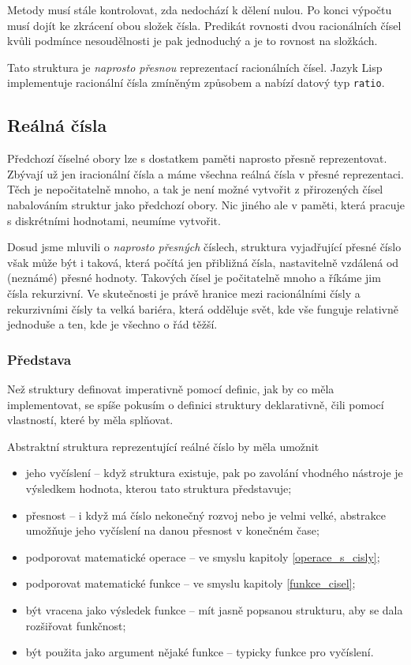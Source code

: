 Metody musí stále kontrolovat, zda nedochází k dělení nulou. Po konci výpočtu musí dojít ke zkrácení obou složek čísla. Predikát rovnosti dvou racionálních čísel kvůli podmínce nesoudělnosti je pak jednoduchý a je to rovnost na složkách.

Tato struktura je \textit{naprosto přesnou} reprezentací racionálních čísel. Jazyk Lisp implementuje racionální čísla zmíněným způsobem a nabízí datový typ \texttt{ratio}.

\subsection{Reálná čísla}
Předchozí číselné obory lze s dostatkem paměti naprosto přesně reprezentovat. Zbývají už jen iracionální čísla a máme všechna reálná čísla v přesné reprezentaci. Těch je nepočitatelně mnoho, a tak je není možné vytvořit z přirozených čísel nabalováním struktur jako předchozí obory. Nic jiného ale v paměti, která pracuje s diskrétními hodnotami, neumíme vytvořit.

Dosud jsme mluvili o \textit{naprosto přesných} číslech, struktura vyjadřující přesné číslo však může být i taková, která počítá jen přibližná čísla, nastavitelně vzdálená od (neznámé) přesné hodnoty. Takových čísel je počitatelně mnoho a říkáme jim čísla rekurzivní. Ve skutečnosti je právě hranice mezi racionálními čísly a rekurzivními čísly ta velká bariéra, která odděluje svět, kde vše funguje relativně jednoduše a ten, kde je všechno o řád těžší.

\subsubsection{Představa}\label{kap:predstava}
Než struktury definovat imperativně pomocí definic, jak by co měla implementovat, se spíše pokusím o definici struktury deklarativně, čili pomocí vlastností, které by měla splňovat.

Abstraktní struktura reprezentující reálné číslo by měla umožnit
\begin{itemize}
\item{jeho vyčíslení -- když struktura existuje, pak po zavolání vhodného nástroje je výsledkem hodnota, kterou tato struktura představuje;}
\item{přesnost -- i když má číslo nekonečný rozvoj nebo je velmi velké, abstrakce umožňuje jeho vyčíslení na danou přesnost v konečném čase;}
\item{podporovat matematické operace -- ve smyslu kapitoly \ref{operace_s_cisly};}
\item{podporovat matematické funkce -- ve smyslu kapitoly \ref{funkce_cisel};}
\item{být vracena jako výsledek funkce -- mít jasně popsanou strukturu, aby se dala rozšiřovat funkčnost;}
\item{být použita jako argument nějaké funkce -- typicky funkce pro vyčíslení.}
\end{itemize}

